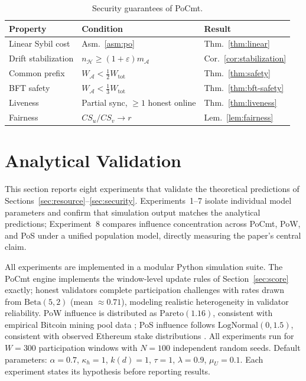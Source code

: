 \documentclass[10pt,journal,twoside]{IEEEtran}
\theoremstyle{remark}
\newcommand{\CS}{\mathit{CS}}
\begin{document}
	\begin{table}[t]
		\centering
		\caption{Security guarantees of PoCmt.}
		\label{tab:security}
		\renewcommand{\arraystretch}{1.15}
		\begin{tabular}{@{}lll@{}}
			\toprule
			\textbf{Property} & \textbf{Condition} & \textbf{Result} \\
			\midrule
			Linear Sybil cost
			& Asm.~\ref{asm:po}
			& Thm.~\ref{thm:linear} \\
			Drift stabilization
			& $n_{\mathcal{H}} \geq (1{+}\varepsilon)m_{\mathcal{A}}$
			& Cor.~\ref{cor:stabilization} \\
			Common prefix
			& $W_{\mathcal{A}} < \tfrac{1}{2}W_{\mathrm{tot}}$
			& Thm.~\ref{thm:safety} \\
			BFT safety
			& $W_{\mathcal{A}} < \tfrac{1}{3}W_{\mathrm{tot}}$
			& Thm.~\ref{thm:bft-safety} \\
			Liveness
			& Partial sync, $\geq 1$ honest online
			& Thm.~\ref{thm:liveness} \\
			Fairness
			& $\CS_u/\CS_v \to r$
			& Lem.~\ref{lem:fairness} \\
			\bottomrule
		\end{tabular}
	\end{table}
	
	\section{Analytical Validation}
	\label{sec:eval}
	
	This section reports eight experiments that validate the
	theoretical predictions of
	Sections~\ref{sec:resource}--\ref{sec:security}.
	Experiments~1--7 isolate individual model parameters and
	confirm that simulation output matches the analytical
	predictions; Experiment~8 compares influence concentration
	across PoCmt, PoW, and PoS under a unified population model,
	directly measuring the paper's central claim.
	
	All experiments are implemented in a modular Python
	simulation suite.
	The PoCmt engine implements the window-level update rules
	of Section~\ref{sec:score} exactly; honest validators
	complete participation challenges with rates drawn from
	$\mathrm{Beta}(5,2)$ (mean $\approx 0.71$), modeling
	realistic heterogeneity in validator reliability.
	PoW influence is distributed as $\mathrm{Pareto}(1.16)$,
	consistent with empirical Bitcoin mining pool data
	\cite{gencer2018decentralization}; PoS influence follows
	$\mathrm{LogNormal}(0, 1.5)$, consistent with observed
	Ethereum stake distributions \cite{wahrstatter2023lido}.
	All experiments run for $W = 300$ participation windows
	with $N = 100$ independent random seeds.
	Default parameters: $\alpha = 0.7$, $\kappa_h = 1$,
	$k(d) = 1$, $\tau = 1$, $\lambda = 0.9$, $\mu_U = 0.1$.
	Each experiment states its hypothesis before reporting
	results.
	
\end{document}
